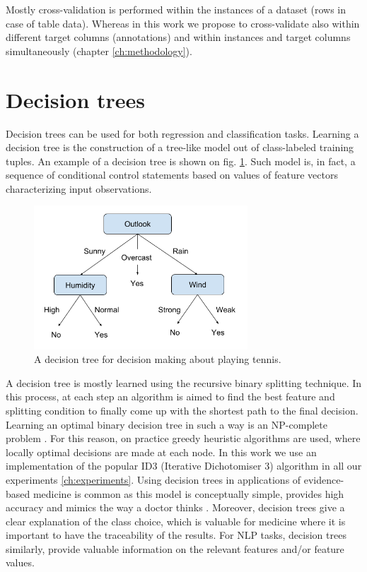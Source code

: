 Mostly cross-validation is performed within the instances of a dataset (rows in case of table data). Whereas in this work we propose to cross-validate also within different target columns (annotations) and within instances and target columns simultaneously (chapter \ref{ch:methodology}).

\section{Decision trees}
Decision trees can be used for both regression and classification tasks. Learning a decision tree is the construction of a tree-like model out of class-labeled training tuples. An example of a decision tree is shown on fig. \ref{fig:decision-tree}. Such model is, in fact, a sequence of conditional control statements based on values of feature vectors characterizing input observations. 

\begin{figure}[h]
    \centering
    \includegraphics[width=8cm]{Images/Decision-tree.png}
    \caption{A decision tree for decision making about playing tennis.}
    \label{fig:decision-tree}
\end{figure}

A decision tree is mostly learned using the recursive binary splitting technique. In this process, at each step an algorithm is aimed to find the best feature and splitting condition to finally come up with the shortest path to the final decision.
Learning an optimal binary decision tree in such a way is an NP-complete problem \citep{Hyafil-1976}. For this reason, on practice greedy heuristic algorithms are used, where locally optimal decisions are made at each node. In this work we use an implementation of the popular ID3 (Iterative Dichotomiser 3) algorithm \citep{Quinlan-1986} in all our experiments \ref{ch:experiments}. Using decision trees in applications of evidence-based medicine is common as this model is conceptually simple, provides high accuracy and mimics the way a doctor thinks \citep{Sackett-1996, Podgorelec-2002}. Moreover, decision trees give a clear explanation of the class choice, which is valuable for medicine where it is important to have the traceability of the results. For NLP tasks, decision trees similarly, provide valuable information on the relevant features and/or feature values.

